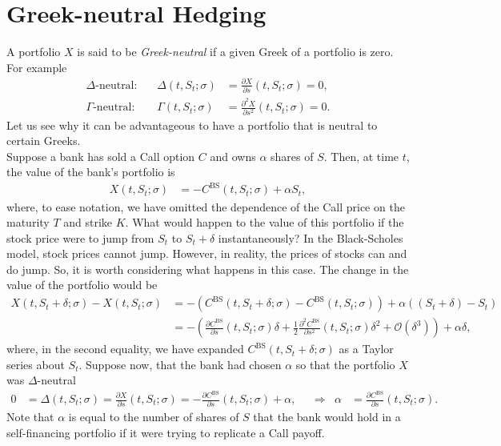 \documentclass[12pt]{book}
\numberwithin{equation}{chapter}
\theoremstyle{plain}
\numberwithin{theorem}{section}
\theoremstyle{definition}
\numberwithin{exercise}{chapter}
\newcommand{\<}{\langle}
\renewcommand{\>}{\rangle}
\renewcommand{\(}{\left(}
\renewcommand{\)}{\right)}
\renewcommand{\[}{\left[}
\renewcommand{\]}{\right]}
\newcommand\Oc{\mathscr{O}}
\newcommand\sig{\sigma}
\newcommand\Gam{\Gamma}
\newcommand\del{\delta}
\renewcommand\d{\partial}
\newcommand\BS{\textrm{BS}}
\theoremstyle{definition}
\numberwithin{question}{section}
\begin{document}
\section{Greek-neutral Hedging}
A portfolio $X$ is said to be \textit{Greek-neutral} if a given Greek of a portfolio is zero.  For example
\begin{align}
\text{$\Delta$-neutral}:&&
\Delta(t,S_t;\sig)
	&=	\frac{\d X}{\d s}(t,S_t;\sig) = 0 , \\
\text{$\Gam$-neutral}:&&
\Gamma(t,S_t;\sig)
	&=	\frac{\d^2 X}{\d s^2}(t,S_t;\sig) = 0 .
\end{align}
Let us see why it can be advantageous to have a portfolio that is neutral to certain Greeks.
\\[0.5em]
Suppose a bank has sold a Call option $C$ and owns $\alpha$ shares of $S$.  Then, at time $t$, the value of the bank's portfolio is
\begin{align}
X(t,S_t;\sig)
	&=	- C^\BS(t,S_t;\sig) + \alpha S_t ,
\end{align}
where, to ease notation, we have omitted the dependence of the Call price on the maturity $T$ and strike $K$.
What would happen to the value of this portfolio if the stock price were to jump from $S_t$ to $S_t + \del$ instantaneously?  
In the Black-Scholes model, stock prices cannot jump.  However, in reality, the prices of stocks can and do jump.  So, it is worth considering what happens in this case.
The change in the value of the portfolio would be
\begin{align}
X(t,S_t+\del;\sig) - X(t,S_t;\sig)
	&=	- \( C^\BS(t,S_t + \del;\sig) - C^\BS(t,S_t;\sig) \) + \alpha \( (S_t + \del) - S_t  \)\\
	&=	- \( \frac{\d C^\BS}{\d s}(t,S_t;\sig) \del + \frac{1}{2} \frac{\d^2 C^\BS}{\d s^2} (t,S_t;\sig) \del ^2 + \Oc(\del^3) \) + \alpha \del ,
\end{align}
where, in the second equality, we have expanded $C^\BS(t,S_t + \del;\sig)$ as a Taylor series about $S_t$.
Suppose now, that the bank had chosen $\alpha$ so that the portfolio $X$ was $\Delta$-neutral
\begin{align}
0
	&=	\Delta(t,S_t;\sig)
	=		\frac{\d X}{\d s}(t,S_t;\sig)
	=		- \frac{\d C^\BS}{\d s}(t,S_t;\sig) + \alpha , &
&\Rightarrow&
\alpha
	&=	\frac{\d C^\BS}{\d s}(t,S_t;\sig) .
\end{align}
Note that $\alpha$ is equal to the number of shares of $S$ that the bank would hold in a self-financing portfolio if it were trying to replicate a Call payoff.
\end{document}
